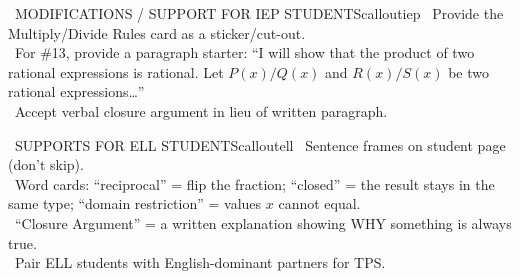 \documentclass[11pt]{article}
\begin{document}
\begin{callout}{\IconPuzzle\ MODIFICATIONS / SUPPORT FOR IEP STUDENTS}{calloutiep}
\textbullet\ Provide the Multiply/Divide Rules card as a sticker/cut-out.\\
\textbullet\ For \#13, provide a paragraph starter: “I will show that the product of two rational expressions is rational. Let \(P(x)/Q(x)\) and \(R(x)/S(x)\) be two rational expressions\ldots”\\
\textbullet\ Accept verbal closure argument in lieu of written paragraph.
\end{callout}

\begin{callout}{\IconGlobe\ SUPPORTS FOR ELL STUDENTS}{calloutell}
\textbullet\ Sentence frames on student page (don’t skip).\\
\textbullet\ Word cards: “reciprocal” = flip the fraction; “closed” = the result stays in the same type; “domain restriction” = values \(x\) cannot equal.\\
\textbullet\ “Closure Argument” = a written explanation showing WHY something is always true.\\
\textbullet\ Pair ELL students with English-dominant partners for TPS.
\end{callout}
\end{document}
